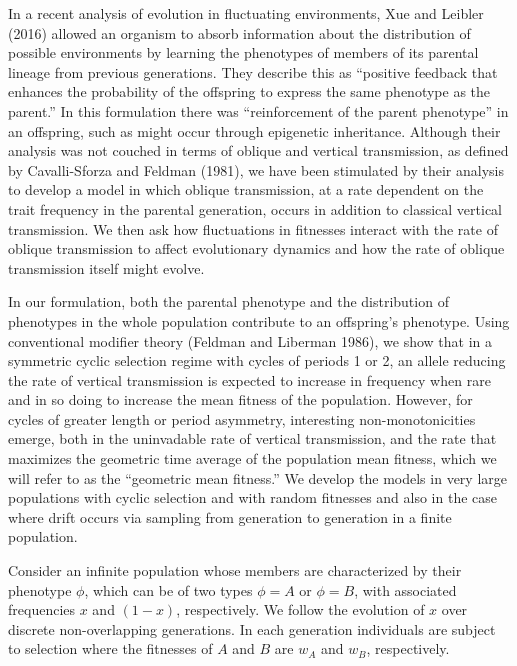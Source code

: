 In a recent analysis of evolution in fluctuating environments, Xue and Leibler (2016) allowed an organism to absorb information about the distribution of possible environments by learning the phenotypes of members of its parental lineage from previous generations. They describe this as ``positive feedback that enhances the probability of the offspring to express the same phenotype as the parent.'' In this formulation there was ``reinforcement of the parent phenotype'' in an offspring, such as might occur through epigenetic inheritance. Although their analysis was not couched in terms of oblique and vertical transmission, as defined by Cavalli-Sforza and Feldman (1981), we have been stimulated by their analysis to develop a model in which oblique transmission, at a rate dependent on the trait frequency in the parental generation, occurs in addition to classical vertical transmission. We then ask how fluctuations in fitnesses interact with the rate of oblique transmission to affect evolutionary dynamics and how the rate of oblique transmission itself might evolve. 

In our formulation, both the parental phenotype and the distribution of phenotypes in the whole population contribute to an offspring's phenotype. Using conventional modifier theory (Feldman and Liberman 1986), we show that in a symmetric cyclic selection regime with cycles of periods 1 or 2, an allele reducing the rate of vertical transmission is expected to increase in frequency when rare and in so doing to increase the mean fitness of the population. However, for cycles of greater length or period asymmetry, interesting non-monotonicities emerge, both in the uninvadable rate of vertical transmission, and the rate that maximizes the geometric time average of the population mean fitness, which we will refer to as the ``geometric mean fitness.'' We develop the models in very large populations with cyclic selection and with random fitnesses and also in the case where drift occurs via sampling from generation to generation in a finite population.

\vfil\break


\smallskip

Consider an infinite population whose members are characterized by their phenotype $\phi$, which can be of two types $\phi=A$ or $\phi=B$, with associated frequencies $x$ and $(1-x)$, respectively. We follow the evolution of $x$ over discrete non-overlapping generations. In each generation individuals are subject to  selection where the fitnesses of $A$ and $B$ are $w_A$ and $w_B$, respectively.


